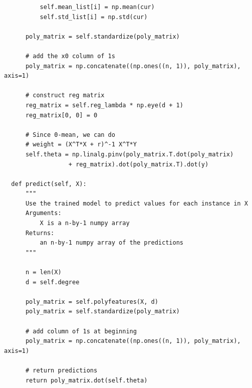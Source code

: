 \documentclass{article}
\newcommand{\1}{\mathbf{1}}
\begin{document}
{\begin{verbatim}
          self.mean_list[i] = np.mean(cur)
          self.std_list[i] = np.std(cur)

      poly_matrix = self.standardize(poly_matrix)

      # add the x0 column of 1s
      poly_matrix = np.concatenate((np.ones((n, 1)), poly_matrix), axis=1)

      # construct reg matrix
      reg_matrix = self.reg_lambda * np.eye(d + 1)
      reg_matrix[0, 0] = 0

      # Since 0-mean, we can do 
      # weight = (X^T*X + r)^-1 X^T*Y
      self.theta = np.linalg.pinv(poly_matrix.T.dot(poly_matrix)
                  + reg_matrix).dot(poly_matrix.T).dot(y)

  def predict(self, X):
      """
      Use the trained model to predict values for each instance in X
      Arguments:
          X is a n-by-1 numpy array
      Returns:
          an n-by-1 numpy array of the predictions
      """

      n = len(X)
      d = self.degree

      poly_matrix = self.polyfeatures(X, d)
      poly_matrix = self.standardize(poly_matrix)

      # add column of 1s at beginning
      poly_matrix = np.concatenate((np.ones((n, 1)), poly_matrix), axis=1)

      # return predictions
      return poly_matrix.dot(self.theta)
\end{verbatim}



}
\end{document}
